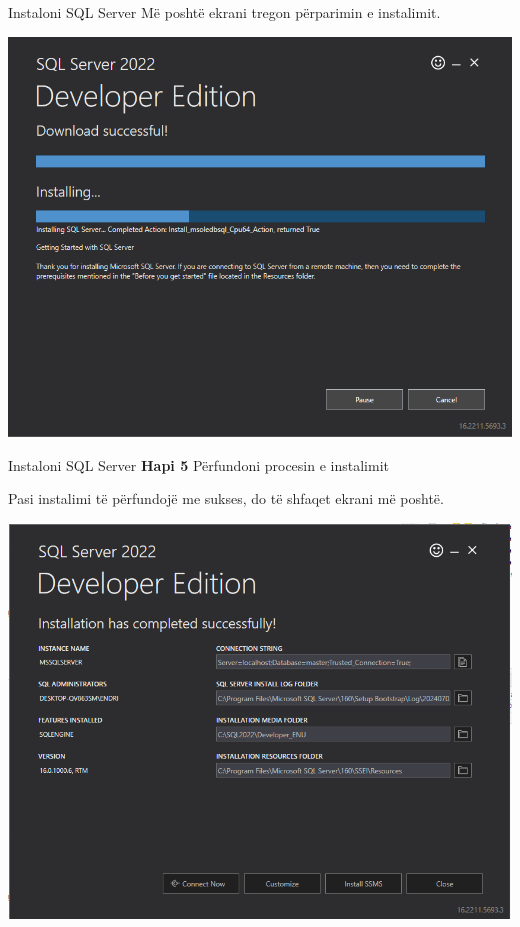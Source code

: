 \documentclass[
  ignorenonframetext,
]{beamer}
\begin{document}
\begin{frame}{Instaloni SQL Server}
\label{instaloni-sql-server-8}
Më poshtë ekrani tregon përparimin e instalimit.

\includegraphics{./Figs/install6.png}
\end{frame}

\begin{frame}{Instaloni SQL Server}
\label{instaloni-sql-server-9}
\textbf{Hapi 5} Përfundoni procesin e instalimit

Pasi instalimi të përfundojë me sukses, do të shfaqet ekrani më poshtë.

\includegraphics{./Figs/install7.png}
\end{frame}
\end{document}
